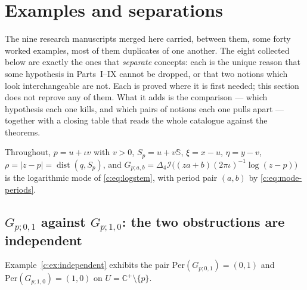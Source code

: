 \documentclass[11pt,a4paper]{article}
\numberwithin{equation}{section}
\theoremstyle{definition}
\theoremstyle{remark}
\theoremstyle{plain}
\newcommand{\CC}{\mathbb C}
\newcommand{\SSS}{\mathbb S}
\newcommand{\Cplus}{\CC^{+}}
\newcommand{\lap}{\Delta_4}
\newcommand{\I}{\mathcal I}
\newcommand{\om}{\omega}
\newcommand{\thet}{\theta}
\newcommand{\etaC}{\eta_{C}}
\newcommand{\Per}{\mathrm{Per}}
\newcommand{\Sp}{S_{p}}
\newcommand{\Rp}{\mathcal R_{p}}      %
\newcommand{\Hg}{\mathcal H_{g}}      %
\newcommand{\Msph}{M^{\mathrm{sph}}}                  %
\newcommand{\Max}{M^{\mathrm{ax}}}                    %
\newcommand{\Eg}{\mathcal E_{g}}
\newcommand{\abs}[1]{\lvert #1\rvert}
\begin{document}

%

\section{Examples and separations}
\label{f:sec:examples}

The nine research manuscripts merged here carried, between them, some forty
worked examples, most of them duplicates of one another. The eight
collected below are exactly the ones that \emph{separate} concepts: each is
the unique reason that some hypothesis in Parts~I--IX cannot be dropped, or
that two notions which look interchangeable are not. Each is proved where
it is first needed; this section does not reprove any of them. What it adds
is the comparison --- which hypothesis each one kills, and which pairs of
notions each one pulls apart --- together with a closing table that reads
the whole catalogue against the theorems.

Throughout, $p=u+\iota v$ with $v>0$, $\Sp=u+v\SSS$, $\xi=x-u$,
$\eta=y-v$, $\rho=\abs{z-p}=\operatorname{dist}(q,\Sp)$, and
$G_{p;a,b}=\lap\I\bigl((za+b)(2\pi\iota)^{-1}\log(z-p)\bigr)$ is the
logarithmic mode of \eqref{c:eq:logstem}, with period pair $(a,b)$ by
\eqref{c:eq:mode-periods}.

\subsection{$G_{p;0,1}$ against $G_{p;1,0}$: the two obstructions are
independent}
\label{f:ex:two-obstructions}

Example~\ref{c:ex:independent} exhibits the pair
$\Per(G_{p;0,1})=(0,1)$ and $\Per(G_{p;1,0})=(1,0)$ on
$U=\Cplus\setminus\{p\}$.
\end{document}
